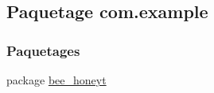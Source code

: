 \hypertarget{namespacecom_1_1example}{}\subsection{Paquetage com.\+example}
\label{namespacecom_1_1example}
\subsubsection*{Paquetages}
\begin{DoxyCompactItemize}
\item 
package \hyperlink{namespacecom_1_1example_1_1bee__honeyt}{bee\+\_\+honeyt}
\end{DoxyCompactItemize}
